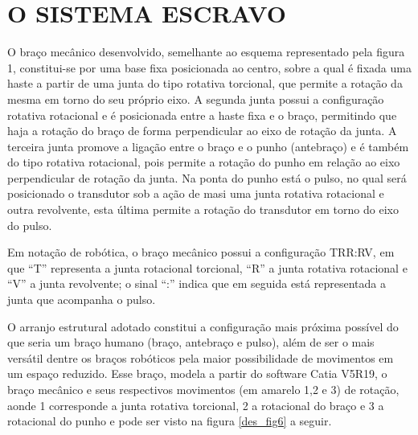 \section{O SISTEMA ESCRAVO}

O braço mecânico desenvolvido, semelhante ao esquema representado pela figura 1, constitui-se por uma base fixa posicionada ao centro, sobre a qual é fixada uma haste a partir de uma junta do tipo rotativa torcional, que permite a rotação da mesma em torno do seu próprio eixo. A segunda junta possui a configuração rotativa rotacional e é posicionada entre a haste fixa e o braço, permitindo que haja a rotação do braço de forma perpendicular ao eixo de rotação da junta. A terceira junta promove a ligação entre o braço e o punho (antebraço) e é também do tipo rotativa rotacional, pois permite a rotação do punho em relação ao eixo perpendicular de rotação da junta. Na ponta do punho está o pulso, no qual será posicionado o transdutor sob a ação de masi uma junta rotativa rotacional e outra revolvente, esta última permite a rotação do transdutor em torno do eixo do pulso.

    Em notação de robótica, o braço mecânico possui a configuração TRR:RV, em que “T” representa a junta rotacional torcional, “R” a junta rotativa rotacional e “V” a junta revolvente; o sinal “:” indica que em seguida está representada a junta que acompanha o pulso.
    
    O arranjo estrutural adotado constitui a configuração mais próxima possível do que seria um braço humano (braço, antebraço e pulso), além de ser o mais versátil dentre os braços robóticos pela maior possibilidade de movimentos em um espaço reduzido. Esse braço, modela a partir do software Catia V5R19, o braço mecânico e seus respectivos movimentos (em amarelo 1,2 e 3) de rotação, aonde 1 corresponde a junta rotativa torcional, 2 a rotacional do braço e 3 a rotacional do punho e pode ser visto na figura \ref{des_fig6} a seguir.

